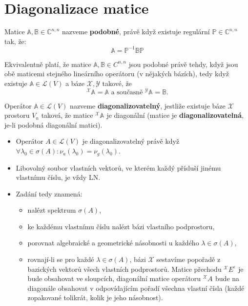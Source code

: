 \documentclass{szzclass}
\newcommand*{\trans}[3]{{}^{#1}#2^{#3}}
\begin{document}
\section{Diagonalizace matice}

\begin{definition}
Matice $\mathbb{A},\mathbb{B}\in \mathbb{C}^{n,n}$ nazveme \textbf{podobné}, právě když existuje regulární $\mathbb{P}\in \mathbb{C}^{n,n}$ tak, že:
\[
  \mathbb{A} = \mathbb{P}^{-1}\mathbb{B}\mathbb{P}
\]
\end{definition}

Ekvivalentně platí, že matice $\mathbb{A}, \mathbb{B} \in C^{n,n}$ jsou podobné právě tehdy, když jsou obě maticemi stejného lineárního operátoru (v nějakých bázích), tedy když existuje $\mathbb{A} \in \mathcal{L}(V)$ a báze $\mathcal{X}, \mathcal{Y}$ takové, že
\[
  \trans{\mathcal{X}}{\mathbb{A}}{} = \mathbb{A}
  \text{ a současně }
  \trans{\mathcal{Y}}{\mathbb{A}}{} = \mathbb{B}.
\]

Operátor $\mathbb{A} \in \mathcal{L}(V)$ nazveme \textbf{diagonalizovatelný}, jestliže existuje báze $\mathcal{X}$ prostoru $V_n$ taková, že matice $\trans{\mathcal{X}}{\mathbb{A}}{}$ je diagonální (matice je \textbf{diagonalizovatelná}, je-li podobná diagonální matici).

\begin{itemize}
\item Operátor $A \in \mathcal{L}(V)$ je diagonalizovatelný právě když $\forall\lambda_0 \in \sigma (A) : \nu_a(\lambda_0) = \nu_g(\lambda_0)$.
\item Libovolný soubor vlastních vektorů, ve kterém každý přísluší jinému vlastnímu číslu, je vždy LN.
\item Zadání  tedy znamená:
  \begin{itemize}
    \item nalézt spektrum $\sigma (A)$,
    \item ke každému vlastnímu číslu nalézt bázi vlastního podprostoru,
    \item porovnat algebraické a geometrické násobnosti u každého $\lambda \in \sigma (A)$,
    \item rovnají-li se pro každé $\lambda \in \sigma (A)$, bázi $\mathcal{X}$ sestavíme popořadě z bazických vektorů všech vlastních podprostorů. Matice přechodu $\trans{\mathcal{X}}{E}{\varepsilon}$ je bude obsahovat ve sloupcích, diagonální matice operátoru $\trans{\mathcal{X}}{A}{}$ bude na diagonále obsahovat v odpovídajícím pořadí všechna vlastní čísla (každé zopakované tolikrát, kolik je jeho násobnost).
  \end{itemize}
\end{itemize}
\end{document}
